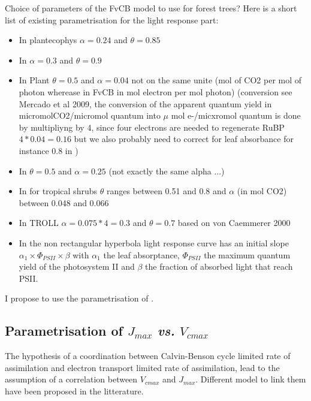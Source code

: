 \documentclass[a4paper,11pt]{article}
\begin{document}
Choice of parameters of the FvCB model to use for
forest trees? Here is a short list of existing parametrisation for the
light response part:
\begin{itemize}

\item In plantecophys \citep{Duursma-2015}  $\alpha = 0.24$ and $\theta = 0.85$

\item In \citet{Medlyn-2002} $\alpha = 0.3$ and $\theta = 0.9$

\item In Plant $\theta = 0.5$ and $\alpha= 0.04$ not on the same unite
  (mol of CO2 per mol of photon wherease in FvCB in mol electron per
  mol photon)  (conversion see Mercado et al 2009, the conversion of
  the apparent quantum yield in micromolCO2/micromol quantum into
  $\mu$ mol e-/micxromol quantum is done by multipliyng by 4, since
  four electrons are needed to regenerate RuBP $4*0.04 = 0.16$ but we
  also probably need to correct for leaf absorbance for instance 0.8 in \citet{Medlyn-2002})

\item In \citet{Sterck-2011} $\theta = 0.5$ and $\alpha = 0.25$ (not exactly the same alpha ...)

\item  In \citet{Valladares-1997} for tropical shrubs $\theta$ ranges between 0.51 and 0.8 and $\alpha$ (in mol CO2) between 0.048 and 0.066

\item In TROLL \citet{Marechaux-2017} $\alpha = 0.075*4 = 0.3$ and $\theta = 0.7$ based on von Caemmerer 2000

\item In \citet{vonCaemmerer-2000} the non rectangular hyperbola light response curve has an initial slope $\alpha_1 \times \Phi_{PSII} \times \beta$ with $\alpha_1$ the leaf absorptance, $\Phi_{PSII}$ the maximum quantum yield of the photosystem II and $\beta$ the fraction of absorbed light that reach PSII.

\end{itemize}

I propose to use the parametrisation of \citet{Marechaux-2017}.


\subsection{Parametrisation of $J_{max}$ \textit{vs.} $V_{cmax}$}

The hypothesis of a coordination between Calvin-Benson cycle limited
rate of assimilation and electron transport limited rate of
assimilation, lead to the assumption of a correlation between $V_{cmax}$ and
$J_{max}$. Different model to link them have been proposed in the
litterature.
\end{document}
